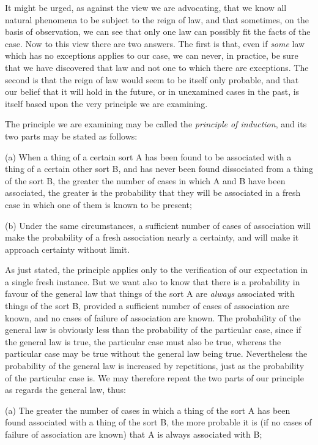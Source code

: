 \documentclass[oneside,letterpaper,12pt]{book}
\begin{document}
It might be urged, as against the view we are advocating, that we know
all natural phenomena to be subject to the reign of law, and that
sometimes, on the basis of observation, we can see that only one law can
possibly fit the facts of the case. Now to this view there are two
answers. The first is that, even if \emph{some} law which has no
exceptions applies to our case, we can never, in practice, be sure that
we have discovered that law and not one to which there are exceptions.
The second is that the reign of law would seem to be itself only
probable, and that our belief that it will hold in the future, or in
unexamined cases in the past, is itself based upon the very principle we
are examining.

The principle we are examining may be called the \emph{principle of
induction}, and its two parts may be stated as follows:

(a) When a thing of a certain sort A has been found to be associated
with a thing of a certain other sort B, and has never been found
dissociated from a thing of the sort B, the greater the number of cases
in which A and B have been associated, the greater is the probability
that they will be associated in a fresh case in which one of them is
known to be present;

(b) Under the same circumstances, a sufficient number of cases of
association will make the probability of a fresh association nearly a
certainty, and will make it approach certainty without limit.

As just stated, the principle applies only to the verification of our
expectation in a single fresh instance. But we want also to know that
there is a probability in favour of the general law that things of the
sort A are \emph{always} associated with things of the sort B, provided
a sufficient number of cases of association are known, and no cases of
failure of association are known. The probability of the general law is
obviously less than the probability of the particular case, since if the
general law is true, the particular case must also be true, whereas the
particular case may be true without the general law being true.
Nevertheless the probability of the general law is increased by
repetitions, just as the probability of the particular case is. We may
therefore repeat the two parts of our principle as regards the general
law, thus:

(a) The greater the number of cases in which a thing of the sort A has
been found associated with a thing of the sort B, the more probable it
is (if no cases of failure of association are known) that A is always
associated with B;
\end{document}
